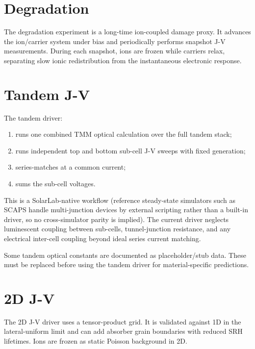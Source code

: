 \documentclass[
  11pt,
  american,
]{report}
\providecommand{\tightlist}{%
  \setlength{\itemsep}{0pt}\setlength{\parskip}{0pt}}
\begin{document}
\hypertarget{degradation}{%
\section{Degradation}\label{degradation}}

The degradation experiment is a long-time ion-coupled damage proxy. It
advances the ion/carrier system under bias and periodically performs
snapshot J-V measurements. During each snapshot, ions are frozen while
carriers relax, separating slow ionic redistribution from the
instantaneous electronic response.

\hypertarget{tandem-j-v}{%
\section{Tandem J-V}\label{tandem-j-v}}

The tandem driver:

\begin{enumerate}
\def\labelenumi{\arabic{enumi}.}
\tightlist
\item
  runs one combined TMM optical calculation over the full tandem stack;
\item
  runs independent top and bottom sub-cell J-V sweeps with fixed
  generation;
\item
  series-matches at a common current;
\item
  sums the sub-cell voltages.
\end{enumerate}

This is a SolarLab-native workflow (reference steady-state simulators
such as SCAPS handle multi-junction devices by external scripting rather
than a built-in driver, so no cross-simulator parity is implied). The
current driver neglects luminescent coupling between sub-cells,
tunnel-junction resistance, and any electrical inter-cell coupling
beyond ideal series current matching.

Some tandem optical constants are documented as placeholder/stub data.
These must be replaced before using the tandem driver for
material-specific predictions.

\hypertarget{d-j-v}{%
\section{2D J-V}\label{d-j-v}}

The 2D J-V driver uses a tensor-product grid. It is validated against 1D
in the lateral-uniform limit and can add absorber grain boundaries with
reduced SRH lifetimes. Ions are frozen as static Poisson background in
2D.
\end{document}
